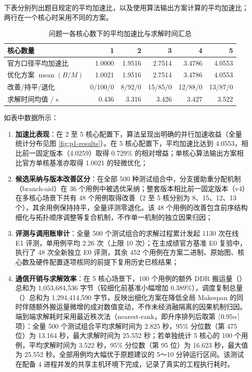 \documentclass[anonymous,withtoc]{gmcm2026}
\providecommand{\tightlist}{\setlength{\itemsep}{0pt}\setlength{\parskip}{0pt}}
\begin{document}
下表分别列出题目规定的平均加速比，以及使用算法输出方案计算的平均加速比；两行在一个核心时采用不同的方案。

\begin{table}[!htbp]\centering
\caption{问题一各核心数下的平均加速比与求解时间汇总}\label{tab:p1-results}\normalsize

\begin{tabularx}{\linewidth}{@{}Xrrrrr@{}}\toprule
核心数量 & 1 & 2 & 3 & 4 & 5 \\
\midrule
官方口径平均加速比 & 1.0000 & 1.9516 & 2.7514 & 3.4786 & 4.0553 \\
优化方案 $\operatorname{mean}(B/M)$ & 1.0021 & 1.9516 & 2.7514 & 3.4786 & 4.0553 \\
改善/持平/退化 & 0/100/0 & 8/92/0 & 15/85/0 & 12/88/0 & 13/87/0 \\
求解时间均值 / s & 0.436 & 3.316 & 3.426 & 3.427 & 3.522 \\
\bottomrule\end{tabularx}\end{table}

如表中数据所示：

\begin{enumerate}
\def\labelenumi{\arabic{enumi}.}
\tightlist
\item
  \textbf{加速比表现}：在 2 至 5 核心配置下，算法呈现出明确的并行加速收益（全量统计分布见图 \ref{fig:p1-results}）。在 5 核心配置下，平均加速比达到 4.0553，相比前一固定版本（4.0259）取得 0.729\% 的相对增益；单核心算法输出方案相比官方单核基准亦取得 1.0021 的轻微优化；
\item
  \textbf{候选采纳与版本改善区分}：在全部 500 种测试组合中，分支援助重分配机制（branch-aid）在 36 个用例中被选优采纳；整套版本相比前一固定版本（v4）在多核心场景下共有 48 个用例取得改善（2 至 5 核分别为 8、15、12、13 个），其余用例保持持平，全量评测零退化。该 48 个用例的改善包含前序结构细化与拓扑顺序调整等复合机制，不作单一机制的独立因果归因；
\item
  \textbf{评测与调用账审计}：全量 500 个测试组合的求解过程累计发起 1130 次在线 E1 评测，单用例平均 2.26 次（上限 10 次）；在主成绩官方基准 E0 复验中，执行了 48 次全新独立 E0 评测，其余 452 个用例在方案二进制、原始图、核心数及硬件配置逐项核同的前提下复用历史已核结果；
\item
  \textbf{通信开销与求解效率}：在 5 核心场景下，100 个用例的额外 DDR 搬运量（\texttt{}）总和为 1,053,684,536 字节（较细化前基准小幅增加 0.389\%），调度复制总量（\texttt{}）总和为 1,294,414,590 字节，反映出细化方案在降低全局 Makespan 的同时伴随额外搬运量微增的成对数值变动，不作未经消融隔离的因果机制归因。端到端求解耗时采用最近秩次法（nearest-rank，即升序排列后取第 \(\lceil 0.95n \rceil\) 项）：全量 500 个测试组合平均求解时间为 2.825 秒，95\% 分位数（第 475 位）为 13.164 秒，最大求解时间为 25.552 秒；若单独统计 5 核心的 100 个用例，平均求解时间为 3.522 秒，95\% 分位数（第 95 位）为 16.623 秒，最大值为 25.552 秒。全部用例均大幅优于原题建议的 5～10 分钟运行区间。该测试在配备 4 进程并发的共享主机环境下完成，记录了真实的工程执行耗时。
\end{enumerate}
\end{document}
